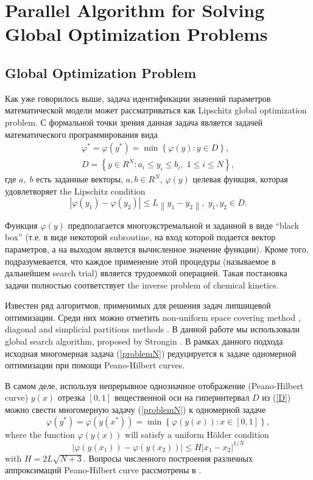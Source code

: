\documentclass{svproc}
\begin{document}
\section{Parallel Algorithm for Solving Global Optimization Problems }\label{Sec_GSA}

\subsection{Global Optimization Problem}

Как уже говорилось выше, задача идентификации значений параметров математической модели может рассматриваться как Lipschitz global optimization problem. 
С формальной точки зрения  данная задача является задачей математического программирования вида
\begin{gather}
 \varphi^* = \varphi(y^\ast)=\min{\left\{\varphi(y):y\in D\right\}}, \label{problemN}\\
 D=\left\{y\in R^N: a_i\leq y_i \leq b_i, \;  1\leq i \leq N\right\} \label{D},
\end{gather}
где $a,\; b$ есть заданные векторы, $a,b\in R^N$, $\varphi(y)$ целевая функция, которая удовлетворяет the Lipschitz condition
\begin{equation}\label{Lip}
\left|\varphi(y_1)-\varphi(y_2)\right|\leq L\left\|y_1-y_2\right\|,\; y_1,y_2 \in D.
\end{equation}


Функция $\varphi(y)$ предполагается многоэкстремальной и заданной в виде ``black box'' (т.е. в виде некоторой subroutine, на вход которой подается вектор параметров, а на выходом является вычисленное значение функции). Кроме того, подразумевается, что каждое применение этой процедуры (называемое в дальнейшем search trial) является трудоемкой операцией. Такая постановка задачи полностью соответствует the inverse problem of chemical kinetics.

Известен ряд алгоритмов, применимых для решения задач липшицевой оптимизации. Среди них можно отметить non-uniform space covering method \cite{Evtushenko2013,Evtushenko2009}, diagonal and simplicial partitions methods \cite{Zilinskas2010,Paulavicius2011}. 
В данной работе мы использовали global search algorithm, proposed by Strongin \cite{Strongin2000}.
В рамках данного подхода исходная многомерная задача (\ref{problemN}) редуцируется к задаче одномерной оптимизации при помощи Peano-Hilbert curves. 

В самом деле, используя непрерывное однозначное отображение (Peano-Hilbert curve) $y(x)$ отрезка $[0,1]$ вещественной оси на гиперинтервал $D$ из (\ref{D}) можно свести многомерную задачу (\ref{problemN}) к одномерной задаче
\[
\varphi(y^\ast)=\varphi(y(x^\ast))=\min{\left\{\varphi(y(x)): x\in[0,1]\right\}},
\]
where the function $\varphi(y(x))$ will satisfy a uniform H{\"o}lder condition
\[
\left|\varphi(y(x_1))-\varphi(y(x_2))\right|\leq H\left|x_1-x_2\right|^{1/N}
\]
with $ H=2 L \sqrt{N+3}$.
Вопросы численного построения различных аппроксимаций Peano-Hilbert curve рассмотрены в \cite{Strongin2000,Sergeyev2013}.
\end{document}
